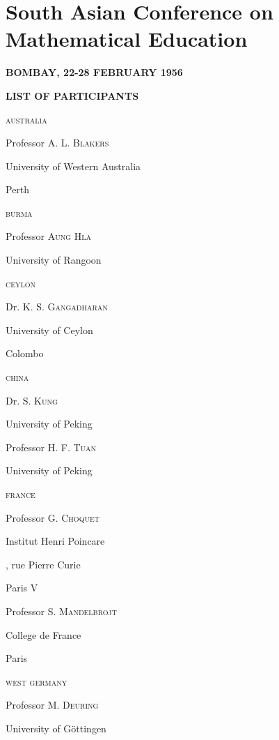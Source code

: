 \chapter{South Asian Conference on Mathematical Education}

\begin{center}
{\bf BOMBAY, 22-28 FEBRUARY 1956}
\medskip

{\large\bf LIST OF PARTICIPANTS}
\end{center}
\medskip

\setcounter{pageoriginal}{8}
\noindent
\textsc{australia}\pageoriginale

\quad Professor \textsc{A. L. Blakers}

\quad University of Western Australia

\quad Perth
\medskip

\noindent
\textsc{burma}

\quad Professor \textsc{Aung Hla}

\quad University of Rangoon

\medskip

\noindent
\textsc{ceylon}

\quad Dr. \textsc{K. S. Gangadharan}

\quad University of Ceylon

\quad Colombo

\medskip

\noindent
\textsc{china}

\quad Dr. \textsc{S. Kung}

\quad University of Peking

\quad Professor \textsc{H. F. Tuan}

\quad University of Peking

\medskip

\noindent
\textsc{france}

\quad Professor \textsc{G. Choquet}

\quad Institut Henri Poincare

, rue Pierre Curie

\quad Paris V
\smallskip

\quad Professor \textsc{S. Mandelbrojt}

\quad College de France

\quad Paris
\medskip

\noindent
\textsc{west germany}

\quad Professor \textsc{M. Deuring}

\quad University of G\"ottingen
\smallskip

